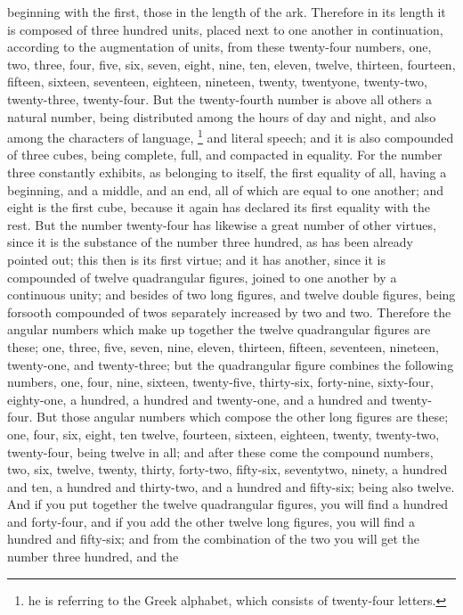 beginning with the first, those in the length of the ark. Therefore in its length it is composed of three
hundred units, placed next to one another in continuation, according to the augmentation of units,
from these twenty-four numbers, one, two, three, four, five, six, seven, eight, nine, ten, eleven,
twelve, thirteen, fourteen, fifteen, sixteen, seventeen, eighteen, nineteen, twenty, twentyone,
twenty-two, twenty-three, twenty-four. But the twenty-fourth number is above all others a natural
number, being distributed among the hours of day and night, and also among the characters of
language, \footnote{he is referring to the Greek alphabet, which consists of twenty-four letters.} and literal speech; and it
is also compounded of three cubes, being complete, full, and compacted in equality. For the
number three constantly exhibits, as belonging to itself, the first equality of all, having a beginning,
and a middle, and an end, all of which are equal to one another; and eight is the first cube, because
it again has declared its first equality with the rest. But the number twenty-four has likewise a great
number of other virtues, since it is the substance of the number three hundred, as has been
already pointed out; this then is its first virtue; and it has another, since it is compounded of twelve
quadrangular figures, joined to one another by a continuous unity; and besides of two long figures,
and twelve double figures, being forsooth compounded of twos separately increased by two and
two. Therefore the angular numbers which make up together the twelve quadrangular figures are
these; one, three, five, seven, nine, eleven, thirteen, fifteen, seventeen, nineteen, twenty-one, and
twenty-three; but the quadrangular figure combines the following numbers, one, four, nine, sixteen,
twenty-five, thirty-six, forty-nine, sixty-four, eighty-one, a hundred, a hundred and twenty-one, and a
hundred and twenty-four. But those angular numbers which compose the other long figures are
these; one, four, six, eight, ten twelve, fourteen, sixteen, eighteen, twenty, twenty-two, twenty-four,
being twelve in all; and after these come the compound numbers, two, six, twelve, twenty, thirty,
forty-two, fifty-six, seventytwo, ninety, a hundred and ten, a hundred and thirty-two, and a hundred
and fifty-six; being also twelve. And if you put together the twelve quadrangular figures, you will find
a hundred and forty-four, and if you add the other twelve long figures, you will find a hundred and
fifty-six; and from the combination of the two you will get the number three hundred, and the
